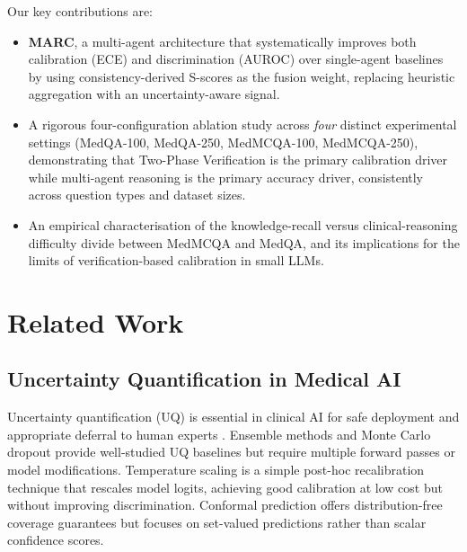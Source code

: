 \documentclass[10pt]{article}
\begin{document}
Our key contributions are:
\begin{itemize}
    \item \textbf{MARC}, a multi-agent architecture that systematically improves
          both calibration (ECE) and discrimination (AUROC) over single-agent
          baselines by using consistency-derived S-scores as the fusion weight,
          replacing heuristic aggregation with an uncertainty-aware signal.
    \item A rigorous four-configuration ablation study across \emph{four}
          distinct experimental settings (MedQA-100, MedQA-250, MedMCQA-100,
          MedMCQA-250), demonstrating that Two-Phase Verification is the
          primary calibration driver while multi-agent reasoning is the
          primary accuracy driver, consistently across question types and
          dataset sizes.
    \item An empirical characterisation of the knowledge-recall versus
          clinical-reasoning difficulty divide between MedMCQA and MedQA,
          and its implications for the limits of verification-based
          calibration in small LLMs.
\end{itemize}

\section{Related Work}
\label{sec:related}

\subsection{Uncertainty Quantification in Medical AI}

Uncertainty quantification (UQ) is essential in clinical AI for safe
deployment and appropriate deferral to human experts
\citep{kompa2021second, begoli2019need}.  Ensemble methods
\citep{lakshminarayanan2017simple} and Monte Carlo dropout
\citep{gal2016uncertainty} provide well-studied UQ baselines but require
multiple forward passes or model modifications.  Temperature scaling
\citep{guo2017calibration} is a simple post-hoc recalibration technique that
rescales model logits, achieving good calibration at low cost but without
improving discrimination.  Conformal prediction \citep{angelopoulos2021gentle}
offers distribution-free coverage guarantees but focuses on set-valued
predictions rather than scalar confidence scores.
\end{document}

